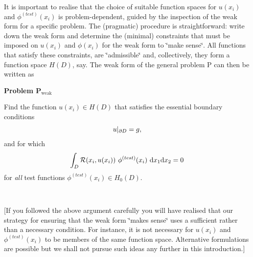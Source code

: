 It is important to realise that the choice of suitable function spaces for $u(x_i)$ and $\phi^{(test)}(x_i)$ is problem-\/dependent, guided by the inspection of the weak form for a specific problem. The (pragmatic) procedure is straightforward\-: write down the weak form and determine the (minimal) constraints that must be imposed on $u(x_i)$ and $\phi(x_i)$ for the weak form to \char`\"{}make sense\char`\"{}. All functions that satisfy these constraints, are \char`\"{}admissible\char`\"{} and, collectively, they form a function space $ H(D) $, say. The weak form of the general problem P can then be written as \par
 \par
 \begin{center} \begin{TabularC}{1}
\hline
\begin{center} \begin{center}{\bfseries  Problem P$_{\mbox{weak}}$  }\end{center}  Find the function $ u(x_i) \in H(D) $ that satisfies the essential boundary conditions \[ \hfill u|_{\partial D} = g, \] and for which \[ \int_D {\cal R}(x_i,u(x_i)) \ \phi^{(test)}(x_i) \ \mbox{d}x_1 \mbox{d}x_2 = 0 \] for {\itshape all} test functions $ \phi^{(test)}(x_i) \in H_0(D). $ \end{center}    \\
\end{TabularC}
\end{center}  \par


\mbox{[}If you followed the above argument carefully you will have realised that our strategy for ensuring that the weak form \char`\"{}makes sense\char`\"{} uses a sufficient rather than a necessary condition. For instance, it is not necessary for $ u(x_i)$ and $ \phi^{(test)}(x_i)$ to be members of the same function space. Alternative formulations are possible but we shall not pursue such ideas any further in this introduction.\mbox{]}



